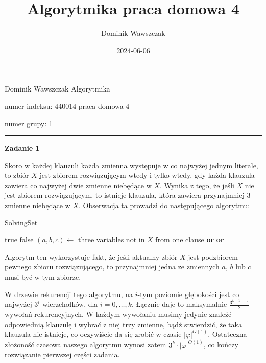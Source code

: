 \documentclass[12pt]{article}
\title{Algorytmika praca domowa 4}
\author{Dominik Wawszczak}
\date{2024-06-06}
\begin{document}
	\setlength{\parindent}{0 cm}
	
	Dominik Wawszczak \hfill Algorytmika
	
	numer indeksu: 440014 \hfill praca domowa 4
	
	numer grupy: 1
	
	\bigskip
	\hrule
	\bigskip
	
	\textbf{Zadanie 1}
	
	\medskip
	
	Skoro w każdej klauzuli każda zmienna występuje w co najwyżej jednym
	literale, to zbiór \(X\) jest zbiorem rozwiązującym wtedy i tylko wtedy, gdy
	każda klauzula zawiera co najwyżej dwie zmienne niebędące w \(X\). Wynika z
	tego, że jeśli \(X\) nie jest zbiorem rozwiązującym, to istnieje klauzula,
	która zawiera przynajmniej \(3\) zmienne niebędące w \(X\). Obserwacja ta
	prowadzi do następującego algorytmu:
	
	\begin{algorithm}
		\caption{SolvingSet}
		\begin{algorithmic}[1]
			        \State \Return true
			    \EndIf
			        \State \Return false
			    \EndIf
			    \State $(a, b, c) \gets$ three variables not in $X$ from one
			    clause
			    \State \Return {}
			    \textbf{or}  \textbf{or}
			    \Statex \hspace{4.685em} 
		\EndProcedure
		\end{algorithmic}
	\end{algorithm}
	
	Algorytm ten wykorzystuje fakt, że jeśli aktualny zbiór \(X\) jest
	podzbiorem pewnego zbioru rozwiązującego, to przynajmniej jedna ze zmiennych
	\(a\), \(b\) lub \(c\) musi być w tym zbiorze.
	
	\medskip
	
	W drzewie rekurencji tego algorytmu, na \(i\)-tym poziomie głębokości jest
	co najwyżej \(3^{i}\) wierzchołków, dla \(i = 0, \ldots, k\). Łącznie
	daje to maksymalnie \(\frac{3^{k + 1} - 1}{2}\) wywołań rekurencyjnych. W
	każdym wywołaniu musimy jedynie znaleźć odpowiednią klauzulę i wybrać z niej
	trzy zmienne, bądź stwierdzić, że taka klauzula nie istnieje, co oczywiście
	da się zrobić w czasie \(|\varphi|^{O(1)}\). Ostateczna złożoność czasowa
	naszego algorytmu wynosi zatem \(3^{k} \cdot |\varphi|^{O(1)}\), co kończy
	rozwiązanie pierwszej części zadania.
	
\end{document}

